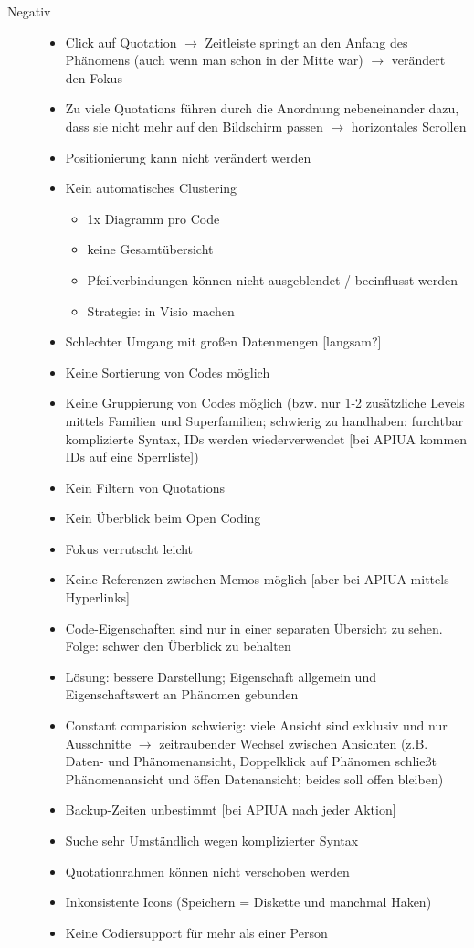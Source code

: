 \begin{description}
	\item[Negativ] \hfill
\begin{itemize}
\itemsep1pt\parskip0pt
\item Click auf Quotation $\rightarrow$ Zeitleiste springt an den Anfang des Phänomens (auch wenn man schon in der Mitte war) $\rightarrow$ verändert den Fokus
\item Zu viele Quotations führen durch die Anordnung nebeneinander dazu, dass sie nicht mehr auf den Bildschirm passen $\rightarrow$ horizontales Scrollen
\item Positionierung kann nicht verändert werden
\item Kein automatisches Clustering
    \begin{itemize}
    \itemsep1pt\parskip0pt
    \item 1x Diagramm pro Code
    \item keine Gesamtübersicht
    \item Pfeilverbindungen können nicht ausgeblendet / beeinflusst werden
    \item Strategie: in Visio machen
    \end{itemize}
\item Schlechter Umgang mit großen Datenmengen [langsam?]
\item Keine Sortierung von Codes möglich
\item Keine Gruppierung von Codes möglich (bzw. nur 1-2 zusätzliche Levels mittels Familien und Superfamilien; schwierig zu handhaben: furchtbar komplizierte Syntax, IDs werden wiederverwendet [bei APIUA kommen IDs auf eine Sperrliste])
\item Kein Filtern von Quotations
\item Kein Überblick beim Open Coding
\item Fokus verrutscht leicht
\item Keine Referenzen zwischen Memos möglich [aber bei APIUA mittels Hyperlinks]
\item Code-Eigenschaften sind nur in einer separaten Übersicht zu sehen. Folge: schwer den Überblick zu behalten
\item Lösung: bessere Darstellung; Eigenschaft allgemein und Eigenschaftswert an Phänomen gebunden
\item Constant comparision schwierig: viele Ansicht sind exklusiv und nur Ausschnitte $\rightarrow$ zeitraubender Wechsel zwischen Ansichten (z.B. Daten- und Phänomenansicht, Doppelklick auf Phänomen schließt Phänomenansicht und öffen Datenansicht; beides soll offen bleiben)
\item Backup-Zeiten unbestimmt [bei APIUA nach jeder Aktion]
\item Suche sehr Umständlich wegen komplizierter Syntax
\item Quotationrahmen können nicht verschoben werden
\item Inkonsistente Icons (Speichern = Diskette und manchmal Haken)
\item Keine Codiersupport für mehr als einer Person
\end{itemize}
\end{description}



